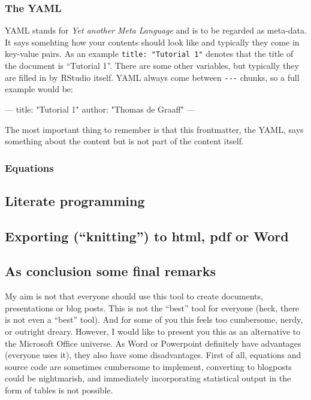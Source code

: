 \documentclass[]{article}
\newenvironment{Shaded}{\begin{snugshade}}{\end{snugshade}}
\newcommand{\StringTok}[1]{\textcolor[rgb]{0.31,0.60,0.02}{{#1}}}
\newcommand{\NormalTok}[1]{{#1}}
\theoremstyle{definition}
\theoremstyle{definition}
\theoremstyle{definition}
\theoremstyle{remark}
\begin{document}
\subsubsection{The YAML}\label{the-yaml}

YAML stands for \emph{Yet another Meta Language} and is to be regarded
as meta-data. It says somehting how your contents should look like and
typically they come in key-value pairs. As an example
\texttt{title:\ "Tutorial\ 1"} denotes that the title of the document is
``Tutorial 1''. There are some other variables, but typically they are
filled in by RStudio itself. YAML always come between \texttt{-\/-\/-}
chunks, so a full example would be:

\begin{Shaded}
\begin{Highlighting}[]
\NormalTok{---}
\NormalTok{title:}\StringTok{ "Tutorial 1"}
\NormalTok{author:}\StringTok{ "Thomas de Graaff"}
\NormalTok{---}
\end{Highlighting}
\end{Shaded}

The most important thing to remember is that this frontmatter, the YAML,
says something about the content but is not part of the content itself.

\subsubsection{Equations}\label{equations}

\subsection{Literate programming}\label{literate-programming}

\subsection{\texorpdfstring{Exporting (``knitting'') to html, pdf or
Word}{Exporting (knitting) to html, pdf or Word}}\label{exporting-knitting-to-html-pdf-or-word}

\subsection{As conclusion some final
remarks}\label{as-conclusion-some-final-remarks}

My aim is not that everyone should use this tool to create documents,
presentations or blog posts. This is not the ``best'' tool for everyone
(heck, there is not even a ``best'' tool). And for some of you this
feels too cumbersome, nerdy, or outright dreary. However, I would like
to present you this as an alternative to the Microsoft Office universe.
As Word or Powerpoint definitely have advantages (everyone uses it),
they also have some disadvantages. First of all, equations and source
code are sometimes cumbersome to implement, converting to blogposts
could be nightmarish, and immediately incorporating statistical output
in the form of tables is not possible.
\end{document}
